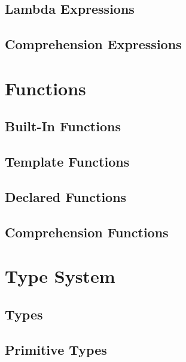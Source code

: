 \documentclass[a4paper,oneside,12pt, extrafontsizes]{memoir}
\begin{document}
  \chapter{Lambda Expressions}
  \label{ch:lambdas}
  

  \chapter{Comprehension Expressions}
  \label{ch:comprehensions}
  

\part{Functions}

  \chapter{Built-In Functions}
  \label{ch:built-in-functions}
  

  \chapter{Template Functions}
  \label{ch:template-functions}
  

  \chapter{Declared Functions}
  \label{ch:declared-functions}

  \chapter{Comprehension Functions}
  \label{ch:comprehension-functions}

\part{Type System}

  \chapter{Types}
  \label{ch:types}

  \chapter{Primitive Types}
  \label{ch:primitive-types}
  
\end{document}
